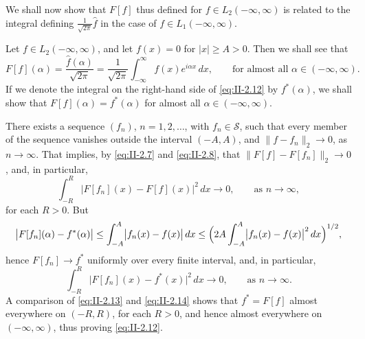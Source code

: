 We shall now show that $F[f]$ thus defined for $f\in L_{2}(-\infty,\infty)$ is related to the integral defining $\frac{1}{\sqrt{2\pi}}\hat f$ in the case of $f\in L_{1}(-\infty,\infty)$.

Let $f\in L_{2}(-\infty,\infty)$, and let $f(x)=0$ for $|x|\ge A>0$. Then we shall see that
\begin{equation}\tag{2.12}\label{eq:II-2.12}
F[f](\alpha)=\frac{\hat f(\alpha)}{\sqrt{2\pi}}
=\frac{1}{\sqrt{2\pi}}\int_{-\infty}^{\infty}f(x)e^{i\alpha x}\,dx,\qquad\text{for almost all }\alpha\in(-\infty,\infty).
\end{equation}
If we denote the integral on the right-hand side of \eqref{eq:II-2.12} by $f^{*}(\alpha)$, we shall show that $F[f](\alpha)=f^{*}(\alpha)$ for almost all $\alpha\in(-\infty,\infty)$.

There exists a sequence $(f_{n})$, $n=1,2,\dots$, with $f_{n}\in\mathcal S$, such that every member of the sequence vanishes outside the interval $(-A,A)$, and $\|f-f_{n}\|_{2}\to 0$, as $n\to\infty$. That implies, by \eqref{eq:II-2.7} and \eqref{eq:II-2.8}, that $\|F[f]-F[f_{n}]\|_{2}\to 0$, and, in particular,
\begin{equation}\tag{2.13}\label{eq:II-2.13}
\int_{-R}^{R}\bigl|F[f_{n}](x)-F[f](x)\bigr|^{2}\,dx\to 0,\qquad\text{as }n\to\infty,
\end{equation}
for each $R>0$. But
\[
\bigl|F[f_{n}](\alpha)-f^{*}(\alpha)\bigr|
\le \int_{-A}^{A}\bigl|f_{n}(x)-f(x)\bigr|\,dx
\le \Bigl(2A\int_{-A}^{A}\bigl|f_{n}(x)-f(x)\bigr|^{2}\,dx\Bigr)^{1/2},
\]
hence $F[f_{n}]\to f^{*}$ uniformly over every finite interval, and, in particular,
\begin{equation}\tag{2.14}\label{eq:II-2.14}
\int_{-R}^{R}\bigl|F[f_{n}](x)-f^{*}(x)\bigr|^{2}\,dx\to 0,\qquad\text{as }n\to\infty.
\end{equation}
A comparison of \eqref{eq:II-2.13} and \eqref{eq:II-2.14} shows that $f^{*}=F[f]$ almost everywhere on $(-R,R)$, for each $R>0$, and hence almost everywhere on $(-\infty,\infty)$, thus proving \eqref{eq:II-2.12}.

